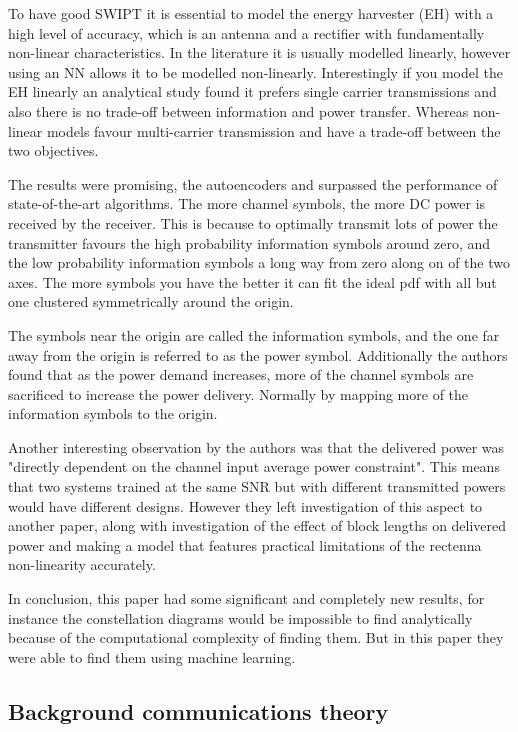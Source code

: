 \documentclass[12pt,onecolumn,letterpaper]{article}
\begin{document}
To have good SWIPT it is essential to model the energy harvester (EH) with a high level of accuracy, which is an antenna and a rectifier with fundamentally non-linear characteristics. In the literature it is usually modelled linearly, however using an NN allows it to be modelled non-linearly. Interestingly if you model the EH  linearly an analytical study found it prefers single carrier transmissions and also there is no trade-off between information and power transfer.  Whereas non-linear models favour multi-carrier transmission and have a trade-off between the two objectives.

The results were promising, the autoencoders and surpassed the performance of state-of-the-art algorithms. The more channel symbols, the more DC power is received by the receiver. This is because to optimally transmit lots of power the transmitter favours the high probability information symbols around zero, and the low probability information symbols a long way from zero along on of the two axes. The more symbols you have the better it can fit the ideal pdf with all but one clustered symmetrically around the origin.

The symbols near the origin are called the information symbols, and the one far away from the origin is referred to as the power symbol. Additionally the authors found that as the power demand increases, more of the channel symbols are sacrificed to increase the power delivery. Normally by mapping more of the information symbols to the origin. 

Another interesting observation by the authors was that the delivered power was "directly dependent on the channel input average power constraint". This means that two systems trained at the same SNR but with different transmitted powers would have different designs. However they left investigation of this aspect to another paper, along with investigation of the effect of block lengths on delivered power and making a model that features practical limitations of the rectenna non-linearity accurately.

In conclusion, this paper had some significant and completely new results, for instance the constellation diagrams would be impossible to find analytically because of the computational complexity of finding them. But in this paper they were able to find them using machine learning.

\subsection{Background communications theory}
\end{document}

